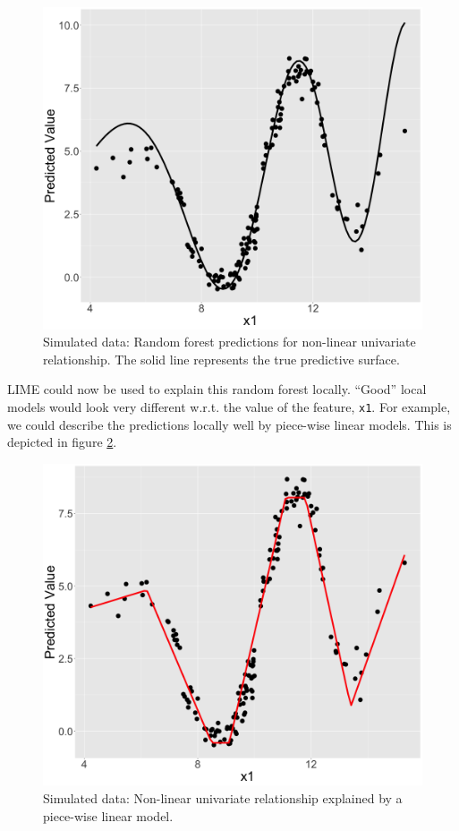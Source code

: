 \documentclass[
]{krantz}
\begin{document}
\begin{figure}

{\centering \includegraphics[width=0.99\linewidth]{images/04-09-03} 

}

\caption{Simulated data: Random forest predictions for non-linear univariate relationship. The solid line represents the true predictive surface.}\label{fig:lime-fig3}
\end{figure}

LIME could now be used to explain this random forest locally.
``Good'' local models would look very different w.r.t. the value of the feature, \texttt{x1}.
For example, we could describe the predictions locally well by piece-wise linear models.
This is depicted in figure \ref{fig:lime-fig4}.

\begin{figure}

{\centering \includegraphics[width=0.99\linewidth]{images/04-09-04} 

}

\caption{Simulated data: Non-linear univariate relationship explained by a piece-wise linear model.}\label{fig:lime-fig4}
\end{figure}
\end{document}
